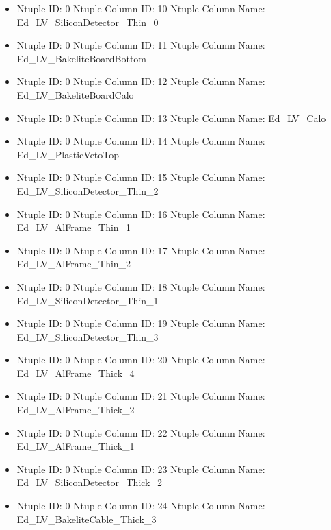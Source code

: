 \documentclass[8pt]{beamer}
\begin{document}
\begin{frame}
\begin{itemize}
        \item Ntuple ID: 0 Ntuple Column ID: 10 Ntuple Column Name: Ed\_LV\_SiliconDetector\_Thin\_0
        
        \item Ntuple ID: 0 Ntuple Column ID: 11 Ntuple Column Name: Ed\_LV\_BakeliteBoardBottom
        
        \item Ntuple ID: 0 Ntuple Column ID: 12 Ntuple Column Name: Ed\_LV\_BakeliteBoardCalo
        
        \item Ntuple ID: 0 Ntuple Column ID: 13 Ntuple Column Name: Ed\_LV\_Calo
        
        \item Ntuple ID: 0 Ntuple Column ID: 14 Ntuple Column Name: Ed\_LV\_PlasticVetoTop
        
        \item Ntuple ID: 0 Ntuple Column ID: 15 Ntuple Column Name: Ed\_LV\_SiliconDetector\_Thin\_2
        
        \item Ntuple ID: 0 Ntuple Column ID: 16 Ntuple Column Name: Ed\_LV\_AlFrame\_Thin\_1
        
        \item Ntuple ID: 0 Ntuple Column ID: 17 Ntuple Column Name: Ed\_LV\_AlFrame\_Thin\_2
        
        \item Ntuple ID: 0 Ntuple Column ID: 18 Ntuple Column Name: Ed\_LV\_SiliconDetector\_Thin\_1
        
        \item Ntuple ID: 0 Ntuple Column ID: 19 Ntuple Column Name: Ed\_LV\_SiliconDetector\_Thin\_3
        
        \item Ntuple ID: 0 Ntuple Column ID: 20 Ntuple Column Name: Ed\_LV\_AlFrame\_Thick\_4
        
        \item Ntuple ID: 0 Ntuple Column ID: 21 Ntuple Column Name: Ed\_LV\_AlFrame\_Thick\_2
        
        \item Ntuple ID: 0 Ntuple Column ID: 22 Ntuple Column Name: Ed\_LV\_AlFrame\_Thick\_1
        
        \item Ntuple ID: 0 Ntuple Column ID: 23 Ntuple Column Name: Ed\_LV\_SiliconDetector\_Thick\_2
        
        \item Ntuple ID: 0 Ntuple Column ID: 24 Ntuple Column Name: Ed\_LV\_BakeliteCable\_Thick\_3
        

\end{itemize}
\end{frame}
\end{document}
